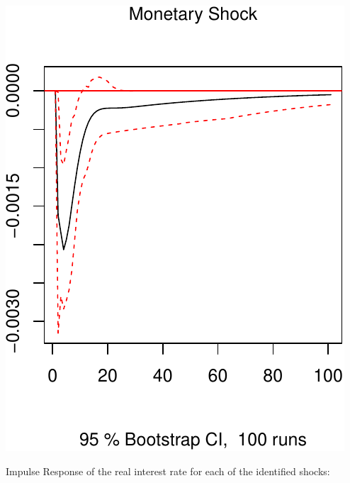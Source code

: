 \documentclass[11pt,preprint, authoryear]{elsarticle}
\numberwithin{equation}{section}
\numberwithin{figure}{section}
\numberwithin{table}{section}
\begin{document}
\includegraphics{TS_proj_files/figure-latex/unnamed-chunk-33-3.pdf}

Impulse Response of the real interest rate for each of the identified
shocks:
\end{document}
